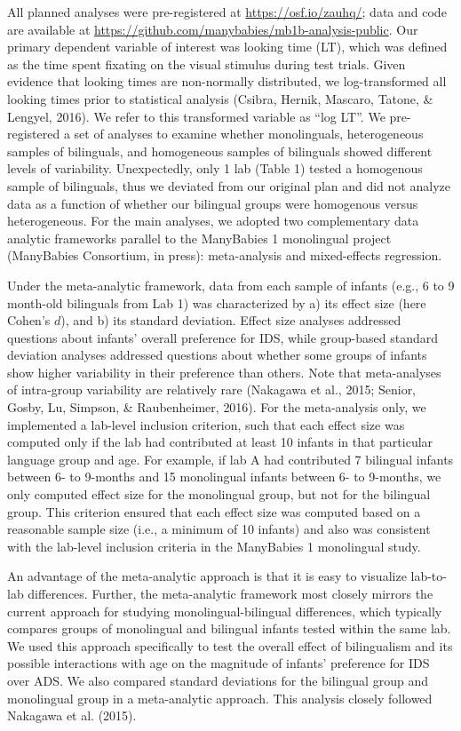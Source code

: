 \documentclass[,man,floatsintext]{apa6}
\begin{document}
All planned analyses were pre-registered at \url{https://osf.io/zauhq/}; data and code are available at \url{https://github.com/manybabies/mb1b-analysis-public}. Our primary dependent variable of interest was looking time (LT), which was defined as the time spent fixating on the visual stimulus during test trials. Given evidence that looking times are non-normally distributed, we log-transformed all looking times prior to statistical analysis (Csibra, Hernik, Mascaro, Tatone, \& Lengyel, 2016). We refer to this transformed variable as \enquote{log LT}. We pre-registered a set of analyses to examine whether monolinguals, heterogeneous samples of bilinguals, and homogeneous samples of bilinguals showed different levels of variability. Unexpectedly, only 1 lab (Table 1) tested a homogenous sample of bilinguals, thus we deviated from our original plan and did not analyze data as a function of whether our bilingual groups were homogenous versus heterogeneous. For the main analyses, we adopted two complementary data analytic frameworks parallel to the ManyBabies 1 monolingual project (ManyBabies Consortium, in press): meta-analysis and mixed-effects regression.

Under the meta-analytic framework, data from each sample of infants (e.g., 6 to 9 month-old bilinguals from Lab 1) was characterized by a) its effect size (here Cohen's \(d\)), and b) its standard deviation. Effect size analyses addressed questions about infants' overall preference for IDS, while group-based standard deviation analyses addressed questions about whether some groups of infants show higher variability in their preference than others. Note that meta-analyses of intra-group variability are relatively rare (Nakagawa et al., 2015; Senior, Gosby, Lu, Simpson, \& Raubenheimer, 2016). For the meta-analysis only, we implemented a lab-level inclusion criterion, such that each effect size was computed only if the lab had contributed at least 10 infants in that particular language group and age. For example, if lab A had contributed 7 bilingual infants between 6- to 9-months and 15 monolingual infants between 6- to 9-months, we only computed effect size for the monolingual group, but not for the bilingual group. This criterion ensured that each effect size was computed based on a reasonable sample size (i.e., a minimum of 10 infants) and also was consistent with the lab-level inclusion criteria in the ManyBabies 1 monolingual study.

An advantage of the meta-analytic approach is that it is easy to visualize lab-to-lab differences. Further, the meta-analytic framework most closely mirrors the current approach for studying monolingual-bilingual differences, which typically compares groups of monolingual and bilingual infants tested within the same lab. We used this approach specifically to test the overall effect of bilingualism and its possible interactions with age on the magnitude of infants' preference for IDS over ADS. We also compared standard deviations for the bilingual group and monolingual group in a meta-analytic approach. This analysis closely followed Nakagawa et al. (2015).
\end{document}
